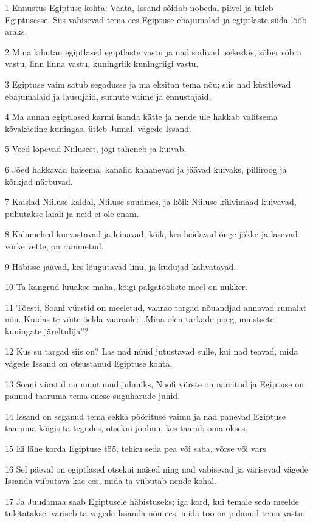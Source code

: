 \par 1 Ennustus Egiptuse kohta: Vaata, Issand sõidab nobedal pilvel ja tuleb Egiptusesse. Siis vabisevad tema ees Egiptuse ebajumalad ja egiptlaste süda lööb araks.
\par 2 Mina kihutan egiptlased egiptlaste vastu ja nad sõdivad isekeskis, sõber sõbra vastu, linn linna vastu, kuningriik kuningriigi vastu.
\par 3 Egiptuse vaim satub segadusse ja ma eksitan tema nõu; siis nad küsitlevad ebajumalaid ja lausujaid, surnute vaime ja ennustajaid.
\par 4 Ma annan egiptlased karmi isanda kätte ja nende üle hakkab valitsema kõvakäeline kuningas, ütleb Jumal, vägede Issand.
\par 5 Veed lõpevad Niilusest, jõgi taheneb ja kuivab.
\par 6 Jõed hakkavad haisema, kanalid kahanevad ja jäävad kuivaks, pilliroog ja kõrkjad närbuvad.
\par 7 Kaislad Niiluse kaldal, Niiluse suudmes, ja kõik Niiluse külvimaad kuivavad, puhutakse laiali ja neid ei ole enam.
\par 8 Kalamehed kurvastavad ja leinavad; kõik, kes heidavad õnge jõkke ja lasevad võrke vette, on rammetud.
\par 9 Häbisse jäävad, kes lõugutavad linu, ja kudujad kahvatavad.
\par 10 Ta kangrud lüüakse maha, kõigi palgatööliste meel on nukker.
\par 11 Tõesti, Soani vürstid on meeletud, vaarao targad nõuandjad annavad rumalat nõu. Kuidas te võite öelda vaaraole: „Mina olen tarkade poeg, muistsete kuningate järeltulija”?
\par 12 Kus su targad siis on? Las nad nüüd jutustavad sulle, kui nad teavad, mida vägede Issand on otsustanud Egiptuse kohta.
\par 13 Soani vürstid on muutunud juhmiks, Noofi vürste on narritud ja Egiptuse on pannud taaruma tema enese suguharude juhid.
\par 14 Issand on seganud tema sekka pöörituse vaimu ja nad panevad Egiptuse taaruma kõigis ta tegudes, otsekui joobnu, kes taarub oma okses.
\par 15 Ei lähe korda Egiptuse töö, tehku seda pea või saba, võrse või vars.
\par 16 Sel päeval on egiptlased otsekui naised ning nad vabisevad ja värisevad vägede Issanda viibutava käe ees, mida ta viibutab nende kohal.
\par 17 Ja Juudamaa saab Egiptusele häbistuseks; iga kord, kui temale seda meelde tuletatakse, väriseb ta vägede Issanda nõu ees, mida too on pidanud tema vastu.
